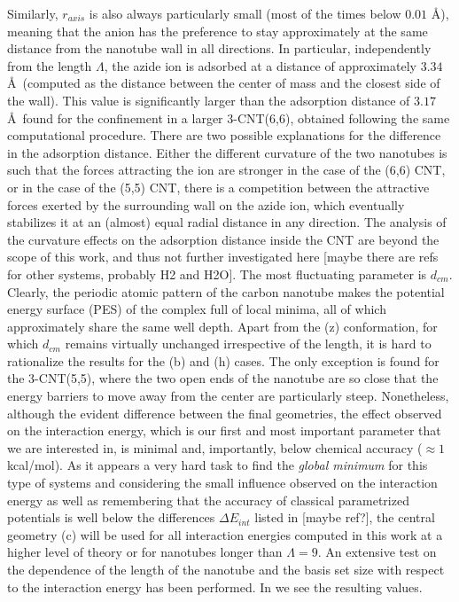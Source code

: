 \documentclass[utf8]{article}
\begin{document}
Similarly, $r_{axis}$ is also always particularly small (most of the times below $0.01$ \AA), meaning that the anion has the preference to stay approximately at the same distance from the nanotube wall in all directions.
In particular, independently from the length $\Lambda$, the azide ion is adsorbed at a distance of approximately $3.34$ \AA\ (computed as the distance between the \ntm center of mass and the closest side of the wall). This value is significantly larger than the adsorption distance of $3.17$ \AA\ found for the confinement in a larger 3-CNT(6,6), obtained following the same computational procedure.
There are two possible explanations for the difference in the adsorption distance. Either the different curvature of the two nanotubes is such that the forces attracting the ion are stronger in the case of the (6,6) CNT, or in the case of the (5,5) CNT, there is a competition between the attractive forces exerted by the surrounding wall on the azide ion, which eventually stabilizes it at an (almost) equal radial distance in any direction.
The analysis of the curvature effects on the adsorption distance inside the CNT are beyond the scope of this work, and thus not further investigated here [maybe there are refs for other systems, probably H2 and H2O].
The most fluctuating parameter is $d_{cm}$. Clearly, the periodic atomic pattern of the carbon nanotube makes the potential energy surface (PES) of the complex full of local minima, all of which approximately share the same well depth. Apart from the (z) conformation, for which $d_{cm}$ remains virtually unchanged irrespective of the length, it is hard to rationalize the results for the (b) and (h) cases.
The only exception is found for the 3-CNT(5,5), where the two open ends of the nanotube are so close that the energy barriers to move away from the center are particularly steep.
Nonetheless, although the evident difference between the final geometries, the effect observed on the interaction energy, which is our first and most important parameter that we are interested in, is minimal and, importantly, below chemical accuracy ($\approx 1$ kcal/mol).
As it appears a very hard task to find the \textit{global minimum} for this type of systems and considering the small influence observed on the interaction energy as well as remembering that the accuracy of classical parametrized potentials is well below the differences $\Delta E_{int}$ listed in  [maybe ref?], the central geometry (c) will be used for all interaction energies computed in this work at a higher level of theory or for nanotubes longer than $\Lambda = 9$.
An extensive test on the dependence of the length of the nanotube and the basis set size with respect to the interaction energy has been performed. In  we see the resulting values.
\end{document}
